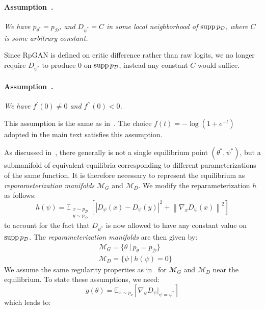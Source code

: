 \paragraph{Assumption~.}
\label{a:1}
\emph{We have $p_{\theta^*}=p_\mathcal{D}$, and $D_{\psi^*}=C$ in some local neighborhood of $\operatorname{supp} p_\mathcal{D}$, where $C$ is some arbitrary constant.}

\noindent Since RpGAN is defined on critic difference rather than raw logits, we no longer require $D_{\psi^*}$ to produce 0 on $\operatorname{supp} p_\mathcal{D}$, instead any constant $C$ would suffice.

\paragraph{Assumption~.}
\label{a:2}
\emph{We have $f^\prime(0)\neq0$ and $f^{\prime\prime}(0)<0$.}

\noindent This assumption is the same as in~\cite{r1}. The choice $f(t) = -\log(1+e^{-t})$ adopted in the main text satisfies this assumption.

As discussed in~\cite{r1}, there generally is not a single equilibrium point $(\theta^*,\psi^*)$, but a submanifold of equivalent equilibria corresponding to different parameterizations of the same function. It is therefore necessary to represent the equilibrium as \emph{reparameterization manifolds} $\mathcal{M}_G$ and $\mathcal{M}_D$. We modify the reparameterization $h$ as follows:
\begin{equation}
\label{eq:h}
h(\psi)=\mathbb{E}_{\substack{x\sim p_\mathcal{D}\\y\sim p_\mathcal{D}}}\left[\left | D_\psi(x)-D_\psi(y)\right |^2   +  \left \| \nabla_x D_\psi(x) \right \|^2\right]
\end{equation}
to account for the fact that $D_{\psi^*}$ is now allowed to have any constant value on $\operatorname{supp} p_\mathcal{D}$. The \emph{reparameterization manifolds} are then given by:
\begin{align}
&\mathcal{M}_G=\{\theta\ \rvert\ p_\theta=p_\mathcal{D}\} \\
&\mathcal{M}_D=\{\psi\ \rvert\ h(\psi)=0 \}
\end{align}
We assume the same regularity properties as in~\cite{r1} for $\mathcal{M}_G$ and $\mathcal{M}_D$ near the equilibrium. To state these assumptions, we need:
\begin{equation}
g(\theta)=\mathbb{E}_{x\sim p_\theta}\left[\nabla_\psi D_\psi\rvert_{\psi=\psi^*}\right]
\end{equation}
which leads to:
